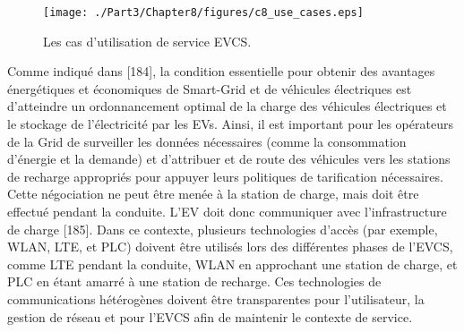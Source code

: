 \begin{figure}[h!] 
 \begin{center} 
 \texttt{[image: ./Part3/Chapter8/figures/c8\_use\_cases.eps]} 
    \caption{Les cas d'utilisation de service EVCS.}
     \label{fig:c5_architecture}
  \end{center} 
\end{figure}


Comme indiqué dans [184], la condition essentielle pour obtenir des avantages énergétiques et économiques de Smart-Grid et de véhicules électriques est d'atteindre un ordonnancement optimal de la charge des véhicules électriques et le stockage de l'électricité par les EVs. Ainsi, il est important pour les opérateurs de la Grid de surveiller les données nécessaires (comme la consommation d'énergie et la demande) et d'attribuer et de route des véhicules vers les stations de recharge appropriés pour appuyer leurs politiques de tarification nécessaires. Cette négociation ne peut être menée à la station de charge, mais doit être effectué pendant la conduite. L'EV doit donc communiquer avec l'infrastructure de charge [185]. Dans ce contexte, plusieurs technologies d'accès (par exemple, WLAN, LTE, et PLC) doivent être utilisés lors des différentes phases de l'EVCS, comme LTE pendant la conduite, WLAN en approchant une station de charge, et PLC en étant amarré à une station de recharge. Ces technologies de communications hétérogènes doivent être transparentes pour l'utilisateur, la gestion de réseau et pour l'EVCS afin de maintenir le contexte de service.

